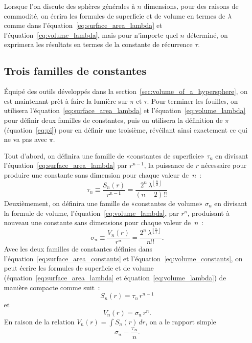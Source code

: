 Lorsque l'on discute des sphères générales à $n$ dimensions, pour des raisons de
commodité, on écrira les formules de superficie et de volume en termes de
$\lambda$ comme dans l'équation~\eqref{eq:surface_area_lambda} et
l'équation~\eqref{eq:volume_lambda}, mais pour n'importe quel $n$ déterminé, on
exprimera les résultats en termes de la constante de récurrence $\tau$.




  \subsection{Trois familles de constantes} %
  \label{sec:three_families_of_constants}

Équipé des outils développés dans la section~\ref{sec:volume_of_a_hypersphere},
on est maintenant prèt à faire la lumière sur $\pi$ et $\tau$. Pour terminer les fouilles, on
utilisera l'équation~\eqref{eq:surface_area_lambda} et
l'équation~\eqref{eq:volume_lambda} pour définir deux familles de constantes,
puis on utilisera la définition de $\pi$ (équation~\eqref{eq:pi}) pour en
définir une troisième, révéilant ainsi exactement ce qui ne va pas avec $\pi$.

Tout d'abord, on définira une famille de «\ns constantes de superficie\ns » $\tau_n$
en divisant \linebreak l'équation~\eqref{eq:surface_area_lambda} par $r^{n-1}$,
la puissance de $r$ nécessaire pour produire une constante sans dimension pour
chaque valeur de~$n$~:
\begin{equation}
\label{eq:surface_area_constants}
\tau_n \equiv \frac{S_n(r)}{r^{n-1}} = \frac{2^n\,\lambda^{\left\lfloor \frac{n}{2} \right\rfloor}}{(n-2)!!}
\end{equation}
Deuxièmement, on définira une famille de «\ns constantes de volume\ns » $\sigma_n$
en divisant la formule de volume, l'équation~\eqref{eq:volume_lambda}, par
$r^n$, produisant à nouveau une constante sans dimensions pour chaque valeur
de~$n$~:
\begin{equation}
\label{eq:volume_constants}
\sigma_n \equiv \frac{V_n(r)}{r^n} = \frac{2^n\,\lambda^{\left\lfloor \frac{n}{2} \right\rfloor}}{n!!}.
\end{equation}
Avec les deux familles de constantes définies dans
l'équation~\eqref{eq:surface_area_constants} et
l'équation~\eqref{eq:volume_constants}, on peut écrire les formules de
superficie et de volume (équation~\eqref{eq:surface_area_lambda} et
équation~\eqref{eq:volume_lambda}) de manière compacte comme suit~:
\[ S_n(r) = \tau_n\,r^{n-1} \]
et
\[ V_n(r) = \sigma_n\,r^n. \]
En raison de la relation $V_n(r) = \int S_n(r)\,dr$, on a le rapport simple
\[
\sigma_n = \frac{\tau_n}{n}.
\]

